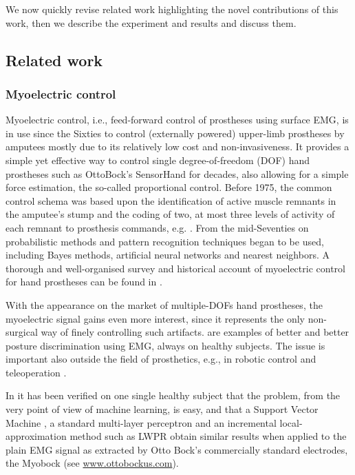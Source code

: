 \documentclass[review,authoryear]{elsarticle}
\renewcommand{\cite}{\citep}
\begin{document}
We now quickly revise related work highlighting the novel contributions of this
work, then we describe the experiment and results and discuss them.

\subsection{Related work}

\subsubsection{Myoelectric control}

Myoelectric control, i.e., feed-forward control of prostheses using surface EMG,
is in use since the Sixties to control (externally powered) upper-limb prostheses
by amputees mostly due to its relatively low cost and non-invasiveness. It
provides a simple yet effective way to control single degree-of-freedom (DOF) hand
prostheses such as OttoBock's SensorHand for decades, also allowing for a simple
force estimation, the so-called proportional control. Before 1975, the common
control schema was based upon the identification of active muscle remnants in the
amputee's stump and the coding of two, at most three levels of activity of each
remnant to prosthesis commands, e.g. \cite{bottomley65,childress69}. From the mid-Seventies
on probabilistic methods and pattern recognition techniques began to be used,
including Bayes methods, artificial neural networks and nearest neighbors. 
A thorough and well-organised survey and historical account of myoelectric
control for hand prostheses can be found in \cite{englehart06}.

With the appearance on the market of multiple-DOFs hand prostheses, the myoelectric
signal gains even more interest, since it represents the only non-surgical
way of finely controlling such artifacts. \cite{englehart01,dunlop,smagt06} are
examples of better and better posture discrimination using EMG, always on healthy
subjects. The issue is important also outside the field of prosthetics, e.g., in
robotic control and teleoperation \cite{fukuda,yokoi}.

In \cite{2008.ICRA,2008.BioCyb} it has been verified on one single healthy subject
that the problem, from the very point of view of machine learning,
is easy, and that a Support Vector Machine \cite{BGV92},
a standard multi-layer perceptron and an incremental local-approximation
method such as LWPR \cite{lwpr} obtain similar results when applied to the plain EMG
signal as extracted by Otto Bock's commercially standard electrodes, the Myobock
(see \url{www.ottobockus.com}).
\end{document}
